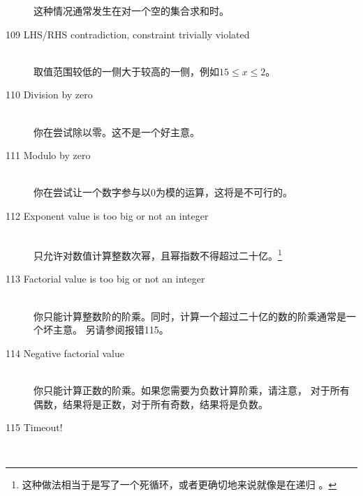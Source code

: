\begin{description}
   这种情况通常发生在对一个空的集合求和时。
\item[109 LHS/RHS contradiction, constraint trivially violated]\ \\
   取值范围较低的一侧大于较高的一侧，例如$15\leq x\leq 2$。
\item[110 Division by zero]\ \\
   你在尝试除以零。这不是一个好主意。
\item[111 Modulo by zero]\ \\
   你在尝试让一个数字参与以0为模的运算，这将是不可行的。
\item[112 Exponent value \code{xxx} is too big or not an integer]\ \\
   只允许对数值计算整数次幂，且幂指数不得超过二十亿。\footnote{
     这种做法相当于是写了一个死循环，或者更确切地来说就像是在递归
     。}
\item[113 Factorial value \code{xxx} is too big or not an integer]\ \\
   你只能计算整数阶的阶乘。同时，计算一个超过二十亿的数的阶乘通常是一个坏主意。
   另请参阅报错115。
\item[114 Negative factorial value]\ \\
   你只能计算正数的阶乘。如果您需要为负数计算阶乘，请注意，
   对于所有偶数，结果将是正数，对于所有奇数，结果将是负数。
\item[115 Timeout!]\ \\

\end{description}
